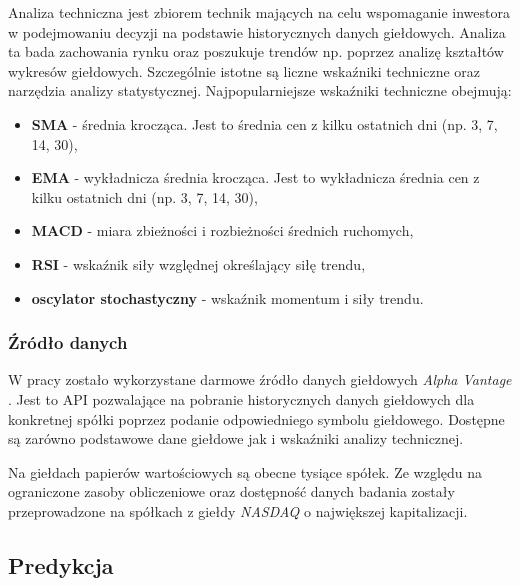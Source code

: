 \documentclass[a4paper, twoside, 11pt, openright]{article}
\begin{document}
Analiza techniczna jest zbiorem technik mających na celu wspomaganie inwestora w podejmowaniu decyzji na podstawie historycznych danych giełdowych. Analiza ta bada zachowania rynku oraz poszukuje trendów np. poprzez analizę kształtów wykresów giełdowych. Szczególnie istotne są liczne wskaźniki techniczne oraz narzędzia analizy statystycznej.
Najpopularniejsze wskaźniki techniczne obejmują:
\begin{itemize}
\item{\textbf{SMA}} - średnia krocząca. Jest to średnia cen z kilku ostatnich dni (np. 3, 7, 14, 30),
\item{\textbf{EMA}} - wykładnicza średnia krocząca. Jest to wykładnicza średnia cen z kilku ostatnich dni (np. 3, 7, 14, 30),
\item{\textbf{MACD}} -  miara zbieżności i rozbieżności średnich ruchomych,
\item{\textbf{RSI}} -  wskaźnik siły względnej określający siłę trendu,
\item{\textbf{oscylator stochastyczny}} -  wskaźnik momentum i siły trendu.
\end{itemize}

\subsubsection{Źródło danych}

W pracy zostało wykorzystane darmowe źródło danych giełdowych \textit{Alpha Vantage} \cite{alphavantage}. Jest to API pozwalające na pobranie historycznych danych giełdowych dla konkretnej spółki poprzez podanie odpowiedniego symbolu giełdowego. Dostępne są zarówno podstawowe dane giełdowe jak i wskaźniki analizy technicznej. 

\bigskip

Na giełdach papierów wartościowych są obecne tysiące spółek. Ze względu na ograniczone zasoby obliczeniowe oraz dostępność danych badania zostały przeprowadzone na spółkach z giełdy \textit{NASDAQ} o największej kapitalizacji.

\subsection{Predykcja}
\end{document}
